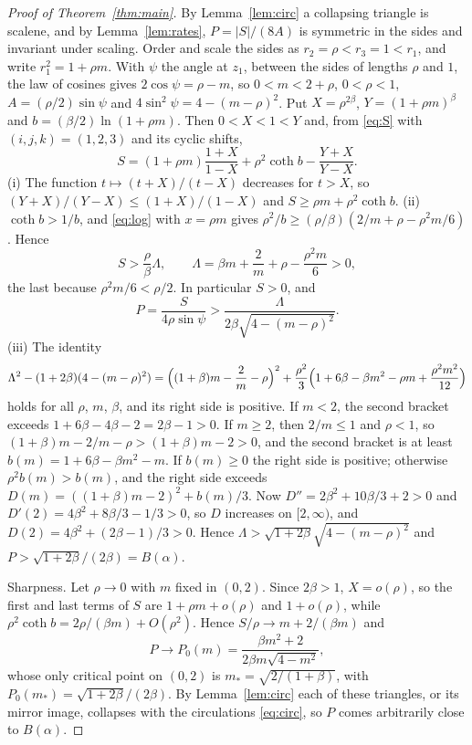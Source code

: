 \documentclass[11pt]{article}
\theoremstyle{definition}
\begin{document}
\begin{proof}[Proof of Theorem~\ref{thm:main}]
By Lemma~\ref{lem:circ} a collapsing triangle is scalene, and by Lemma~\ref{lem:rates}, $P = |S|/(8A)$ is symmetric in the sides and invariant under scaling. Order and scale the sides as $r_2 = \rho < r_3 = 1 < r_1$, and write $r_1^2 = 1 + \rho m$. With $\psi$ the angle at $z_1$, between the sides of lengths $\rho$ and $1$, the law of cosines gives $2\cos\psi = \rho - m$, so $0 < m < 2 + \rho$, $0 < \rho < 1$, $A = (\rho/2)\sin\psi$ and $4\sin^2\psi = 4 - (m - \rho)^2$. Put $X = \rho^{2\beta}$, $Y = (1 + \rho m)^\beta$ and $b = (\beta/2)\ln(1 + \rho m)$. Then $0 < X < 1 < Y$ and, from \eqref{eq:S} with $(i, j, k) = (1, 2, 3)$ and its cyclic shifts,
\[
S = (1 + \rho m)\frac{1 + X}{1 - X} + \rho^2\coth b - \frac{Y + X}{Y - X}.
\]
(i) The function $t \mapsto (t + X)/(t - X)$ decreases for $t > X$, so $(Y + X)/(Y - X) \le (1 + X)/(1 - X)$ and $S \ge \rho m + \rho^2\coth b$. (ii) $\coth b > 1/b$, and \eqref{eq:log} with $x = \rho m$ gives $\rho^2/b \ge (\rho/\beta)(2/m + \rho - \rho^2 m/6)$. Hence
\[
S > \frac{\rho}{\beta}\Lambda, \qquad \Lambda = \beta m + \frac{2}{m} + \rho - \frac{\rho^2 m}{6} > 0,
\]
the last because $\rho^2 m/6 < \rho/2$. In particular $S > 0$, and
\[
P = \frac{S}{4\rho\sin\psi} > \frac{\Lambda}{2\beta\sqrt{4 - (m - \rho)^2}}.
\]
(iii) The identity
\begin{equation}\label{eq:id}
\Lambda^2 - (1 + 2\beta)(4 - (m - \rho)^2) = \Bigl((1 + \beta)m - \frac2m - \rho\Bigr)^2 + \frac{\rho^2}{3}\Bigl(1 + 6\beta - \beta m^2 - \rho m + \frac{\rho^2 m^2}{12}\Bigr)
\end{equation}
holds for all $\rho$, $m$, $\beta$, and its right side is positive. If $m < 2$, the second bracket exceeds $1 + 6\beta - 4\beta - 2 = 2\beta - 1 > 0$. If $m \ge 2$, then $2/m \le 1$ and $\rho < 1$, so $(1 + \beta)m - 2/m - \rho > (1 + \beta)m - 2 > 0$, and the second bracket is at least $b(m) = 1 + 6\beta - \beta m^2 - m$. If $b(m) \ge 0$ the right side is positive; otherwise $\rho^2 b(m) > b(m)$, and the right side exceeds $D(m) = ((1 + \beta)m - 2)^2 + b(m)/3$. Now $D'' = 2\beta^2 + 10\beta/3 + 2 > 0$ and $D'(2) = 4\beta^2 + 8\beta/3 - 1/3 > 0$, so $D$ increases on $[2, \infty)$, and $D(2) = 4\beta^2 + (2\beta - 1)/3 > 0$. Hence $\Lambda > \sqrt{1 + 2\beta}\sqrt{4 - (m - \rho)^2}$ and $P > \sqrt{1 + 2\beta}/(2\beta) = B(\alpha)$.

Sharpness. Let $\rho \to 0$ with $m$ fixed in $(0, 2)$. Since $2\beta > 1$, $X = o(\rho)$, so the first and last terms of $S$ are $1 + \rho m + o(\rho)$ and $1 + o(\rho)$, while $\rho^2\coth b = 2\rho/(\beta m) + O(\rho^2)$. Hence $S/\rho \to m + 2/(\beta m)$ and
\[
P \to P_0(m) = \frac{\beta m^2 + 2}{2\beta m\sqrt{4 - m^2}},
\]
whose only critical point on $(0, 2)$ is $m_* = \sqrt{2/(1 + \beta)}$, with $P_0(m_*) = \sqrt{1 + 2\beta}/(2\beta)$. By Lemma~\ref{lem:circ} each of these triangles, or its mirror image, collapses with the circulations \eqref{eq:circ}, so $P$ comes arbitrarily close to $B(\alpha)$.
\end{proof}
\end{document}

